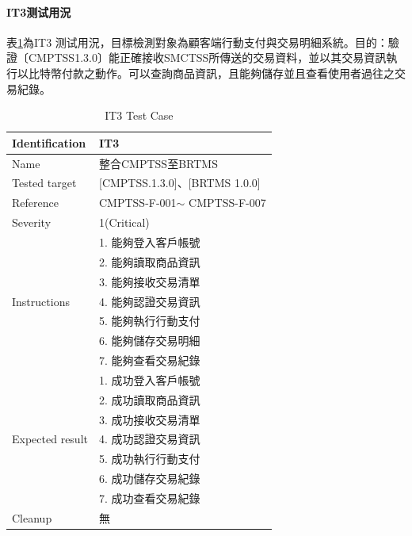 			\paragraph{IT3测试用況}
				表\ref{IT3TestCase}為IT3 测试用況，目標檢測對象為顧客端行動支付與交易明細系統。目的：驗證〔CMPTSS1.3.0〕能正確接收SMCTSS所傳送的交易資料，並以其交易資訊執行以比特幣付款之動作。可以查詢商品資訊，且能夠儲存並且查看使用者過往之交易紀錄。


					\begin{table}[htbp]
					\caption{IT3 Test Case} %
					\centering %
					\label{IT3TestCase} %
					\begin{tabular}{|l|l|}
					\hline
					Identification & IT3 \\ \hline
					Name & 整合CMPTSS至BRTMS \\ \hline
					Tested target & {[}CMPTSS.1.3.0{]}、{[}BRTMS 1.0.0{]} \\ \hline
					Reference & CMPTSS-F-001$\sim$ CMPTSS-F-007 \\ \hline
					Severity & 1(Critical) \\ \hline
					\multirow{7}{*}{Instructions} & 1.     能夠登入客戶帳號 \\ \cline{2-2} 
					 & 2.     能夠讀取商品資訊 \\ \cline{2-2} 
					 & 3.     能夠接收交易清單 \\ \cline{2-2} 
					 & 4.     能夠認證交易資訊 \\ \cline{2-2} 
					 & 5.     能夠執行行動支付 \\ \cline{2-2} 
					 & 6.     能夠儲存交易明細 \\ \cline{2-2} 
					 & 7.     能夠查看交易紀錄 \\ \hline
					\multirow{7}{*}{Expected result} & 1.     成功登入客戶帳號 \\ \cline{2-2} 
					 & 2.     成功讀取商品資訊 \\ \cline{2-2} 
					 & 3.     成功接收交易清單 \\ \cline{2-2} 
					 & 4.     成功認證交易資訊 \\ \cline{2-2} 
					 & 5.     成功執行行動支付 \\ \cline{2-2} 
					 & 6.     成功儲存交易紀錄 \\ \cline{2-2} 
					 & 7.     成功查看交易紀錄 \\ \hline
					Cleanup & 無 \\ \hline
					\end{tabular}
					\end{table}

